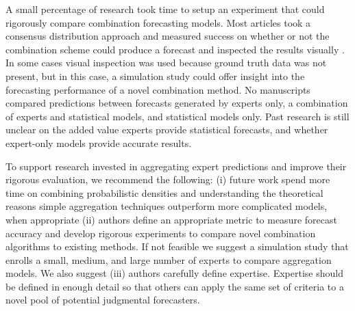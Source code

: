 \documentclass[preprint,authoryear,nonatbib]{elsarticle}
\begin{document}
A small percentage of research took time to setup an experiment that could rigorously compare combination forecasting models.
Most articles took a consensus distribution approach and measured success on whether or not the combination scheme could produce a forecast and inspected the results visually .
In some cases visual inspection was used because ground truth data was not present, but in this case, a simulation study could offer insight into the forecasting performance of a novel combination method.
No manuscripts compared predictions between forecasts generated by experts only, a combination of experts and statistical models, and statistical models only.
Past research is still unclear on the added value experts provide statistical forecasts, and whether expert-only models provide accurate results.

To support research invested in aggregating expert predictions and improve their rigorous evaluation, we recommend the following: (i) future work spend more time on combining probabilistic densities and understanding the theoretical reasons simple aggregation techniques outperform more complicated models, when appropriate (ii) authors define an appropriate metric to measure forecast accuracy and develop rigorous experiments to compare novel combination algorithms to existing methods.
If not feasible we suggest a simulation study that enrolls a small, medium, and large number of experts to compare aggregation models.
We also suggest (iii) authors carefully define expertise.
Expertise should be defined in enough detail so that others can apply the same set of criteria to a novel pool of  potential judgmental forecasters.
\end{document}
